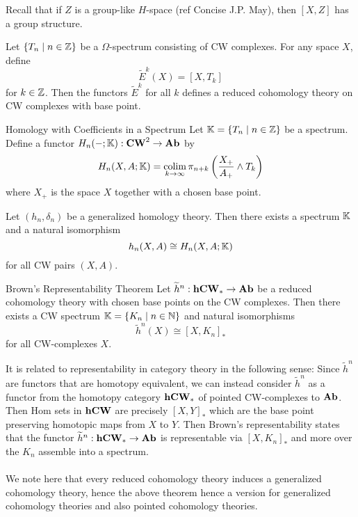 \documentclass[a4paper]{article}
\begin{document}
Recall that if $Z$ is a group-like $H$-space (ref Concise J.P. May), then $[X,Z]$ has a group structure. 

\begin{thm}{}{} Let $\{T_n\;|\;n\in\mathbb{Z}\}$ be a $\Omega$-spectrum consisting of CW complexes. For any space $X$, define $$\widetilde{E}^k(X)=[X,T_k]$$ for $k\in\mathbb{Z}$. Then the functors $\widetilde{E}^k$ for all $k$ defines a reduced cohomology theory on CW complexes with base point. 
\end{thm}

\begin{defn}{Homology with Coefficients in a Spectrum}{} Let $\mathbb{K}=\{T_n\;|\;n\in\mathbb{Z}\}$ be a spectrum. Define a functor $H_n(-;\mathbb{K}):\bold{CW}^2\to\bold{Ab}$ by $$H_n(X,A;\mathbb{K})=\operatorname*{colim}_{k\to\infty}\pi_{n+k}\left(\frac{X_+}{A_+}\wedge T_k\right)$$ where $X_+$ is the space $X$ together with a chosen base point. 
\end{defn}

\begin{thm}{}{} Let $(h_n,\delta_n)$ be a generalized homology theory. Then there exists a spectrum $\mathbb{K}$ and a natural isomorphism $$h_n(X,A)\cong H_n(X,A;\mathbb{K})$$ for all CW pairs $(X,A)$. 
\end{thm}

\begin{thm}{Brown's Representability Theorem}{} Let $\widetilde{h}^n:\bold{hCW}_\ast\to\bold{Ab}$ be a reduced cohomology theory with chosen base points on the CW complexes. Then there exists a CW spectrum $\mathbb{K}=\{K_n\;|\;n\in\mathbb{N}\}$ and natural isomorphisms $$\widetilde{h}^n(X)\cong[X,K_n]_\ast$$ for all CW-complexes $X$. 
\end{thm}

It is related to representability in category theory in the following sense: Since $\widetilde{h}^n$ are functors that are homotopy equivalent, we can instead consider $\widetilde{h}^n$ as a functor from the homotopy category $\bold{hCW}_\ast$ of pointed CW-complexes to $\bold{Ab}$. Then Hom sets in $\bold{hCW}$ are precisely $[X,Y]_\ast$ which are the base point preserving homotopic maps from $X$ to $Y$. Then Brown's representability states that the functor $\widetilde{h}^n:\bold{hCW}_\ast\to\bold{Ab}$ is representable via $[X,K_n]_\ast$ and more over the $K_n$ assemble into a spectrum. \\~\\

We note here that every reduced cohomology theory induces a generalized cohomology theory, hence the above theorem hence a version for generalized cohomology theories and also pointed cohomology theories. 
\end{document}
